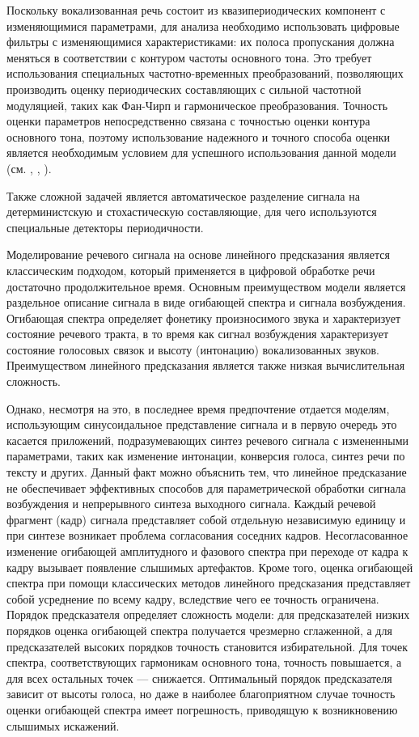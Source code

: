 Поскольку вокализованная речь состоит из квазипериодических компонент с изменяющимися параметрами, для анализа необходимо использовать цифровые фильтры с изменяющимися характеристиками: их полоса пропускания должна меняться в соответствии с контуром частоты основного тона. Это требует использования специальных частотно-временных преобразований, позволяющих производить оценку периодических составляющих с сильной частотной модуляцией, таких как Фан-Чирп и гармоническое преобразования. Точность оценки параметров непосредственно связана с точностью оценки контура основного тона, поэтому использование надежного и точного способа оценки является необходимым условием для успешного использования данной модели (см. , , ). 

Также сложной задачей является автоматическое разделение сигнала на детерминистскую и стохастическую составляющие, для чего используются специальные детекторы периодичности.

Моделирование речевого сигнала на основе линейного предсказания является классическим подходом, который применяется в цифровой обработке речи достаточно продолжительное время. Основным преимуществом модели является раздельное описание сигнала в виде огибающей спектра и сигнала возбуждения. Огибающая спектра определяет фонетику произносимого звука и характеризует состояние речевого тракта, в то время как сигнал возбуждения характеризует состояние голосовых связок и высоту (интонацию) вокализованных звуков. Преимуществом линейного предсказания является также низкая вычислительная сложность. 

Однако, несмотря на это, в последнее время предпочтение отдается моделям, использующим синусоидальное представление сигнала и в первую очередь это касается приложений, подразумевающих синтез речевого сигнала с измененными параметрами, таких как изменение интонации, конверсия голоса, синтез речи по тексту и других. Данный факт можно объяснить тем, что линейное предсказание не обеспечивает эффективных способов для параметрической обработки сигнала возбуждения и непрерывного синтеза выходного сигнала. Каждый речевой фрагмент (кадр) сигнала представляет собой отдельную независимую единицу и при синтезе возникает проблема согласования соседних кадров. Несогласованное изменение огибающей амплитудного и фазового спектра при переходе от кадра к кадру вызывает появление слышимых артефактов. Кроме того, оценка огибающей спектра при помощи классических методов линейного предсказания представляет собой усреднение по всему кадру, вследствие чего ее точность ограничена. Порядок предсказателя определяет сложность модели: для предсказателей низких порядков оценка огибающей спектра получается чрезмерно сглаженной, а для предсказателей высоких порядков точность становится избирательной. Для точек спектра, соответствующих гармоникам основного тона, точность повышается, а для всех остальных точек --- снижается. Оптимальный порядок предсказателя зависит от высоты голоса, но даже в наиболее благоприятном случае точность оценки огибающей спектра имеет погрешность, приводящую к возникновению слышимых искажений.

